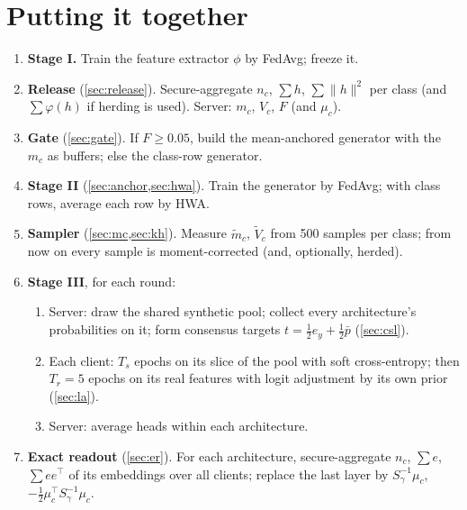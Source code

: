 \documentclass[11pt]{article}
\theoremstyle{plain}
\theoremstyle{definition}
\newcommand{\norm}[1]{\lVert #1\rVert}
\begin{document}
\section{Putting it together}\label{sec:together}

\begin{steps}
\begin{enumerate}[leftmargin=1.4em]
\item \textbf{Stage I.} Train the feature extractor $\phi$ by FedAvg; freeze it.
\item \textbf{Release} (\cref{sec:release}). Secure-aggregate $n_c$, $\sum h$, $\sum\norm h^2$ per class (and $\sum\varphi(h)$ if
herding is used). Server: $m_c$, $V_c$, $F$ (and $\mu_c$).
\item \textbf{Gate} (\cref{sec:gate}). If $F\ge0.05$, build the mean-anchored generator with the $m_c$ as buffers;
else the class-row generator.
\item \textbf{Stage II} (\cref{sec:anchor,sec:hwa}). Train the generator by FedAvg; with class rows, average each row by
HWA.
\item \textbf{Sampler} (\cref{sec:mc,sec:kh}). Measure $\tilde m_c$, $\tilde V_c$ from 500 samples per class; from now on
every sample is moment-corrected (and, optionally, herded).
\item \textbf{Stage III}, for each round:
  \begin{enumerate}
  \item Server: draw the shared synthetic pool; collect every architecture's probabilities on it; form consensus
  targets $t=\frac12e_y+\frac12\bar p$ (\cref{sec:csl}).
  \item Each client: $T_s$ epochs on its slice of the pool with soft cross-entropy; then $T_r=5$ epochs on its real
  features with logit adjustment by its own prior (\cref{sec:la}).
  \item Server: average heads within each architecture.
  \end{enumerate}
\item \textbf{Exact readout} (\cref{sec:er}). For each architecture, secure-aggregate $n_c$, $\sum e$, $\sum ee^\top$ of its
embeddings over all clients; replace the last layer by $S_\gamma^{-1}\mu_c$, $-\frac12\mu_c^\top S_\gamma^{-1}\mu_c$.
\end{enumerate}
\end{steps}
\end{document}
